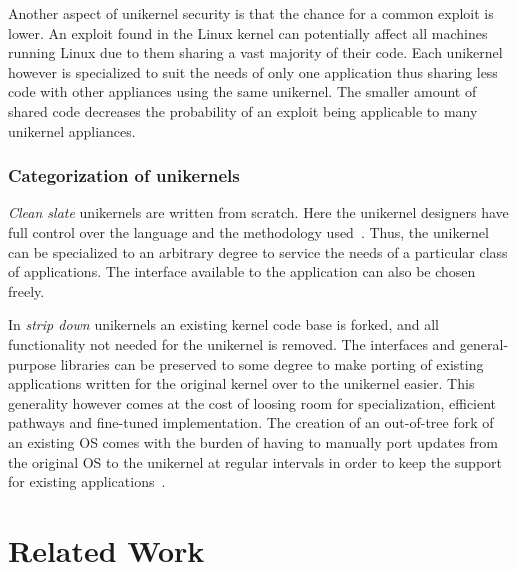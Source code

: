 \documentclass[10pt,twocolumn,a4paper]{article}
\begin{document}
      Another aspect of unikernel security is that the chance for a common exploit is lower.
      An exploit found in the Linux kernel can potentially affect all machines running Linux
      due to them sharing a vast majority of their code.
      Each unikernel however is specialized to suit the needs of only one application thus
      sharing less code with other appliances using the same unikernel.
      The smaller amount of shared code decreases the probability of an exploit being applicable
      to many unikernel appliances.

    \subsubsection{Categorization of unikernels}\label{sec:categories-of-unikernels}
      \textit{Clean slate} unikernels are written from scratch.
      Here the unikernel designers have full control over the language
      and the methodology used~\cite{raza19}.
      Thus, the unikernel can be specialized to an arbitrary degree to service the needs
      of a particular class of applications.
      The interface available to the application can also be chosen freely.

      In \textit{strip down} unikernels an existing kernel code base is forked,
      and all functionality not needed for the unikernel is removed.
      The interfaces and general-purpose libraries can be preserved to some degree
      to make porting of existing applications written for the original kernel
      over to the unikernel easier. 
      This generality however comes at the cost of loosing room for specialization,
      efficient pathways and fine-tuned implementation.
      The creation of an out-of-tree fork of an existing OS comes with the burden of
      having to manually port updates from the original OS to the unikernel at regular intervals
      in order to keep the support for existing applications~\cite{raza19}.
      
\section{Related Work}\label{sec:relwork} 
\end{document}

